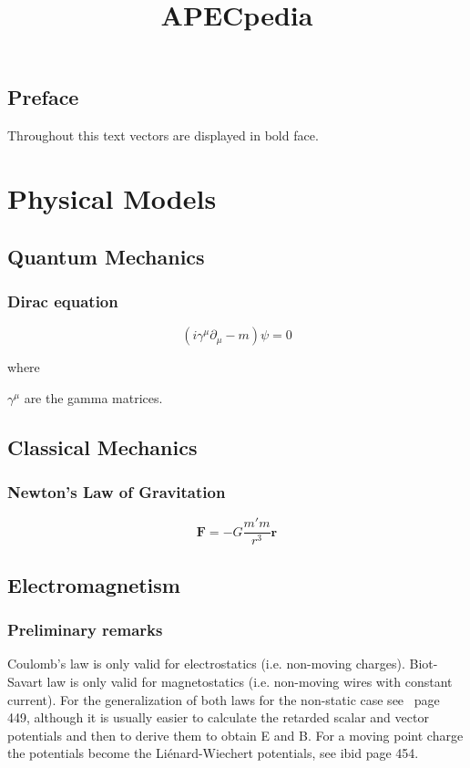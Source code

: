\documentclass[english]{book}
\title{APECpedia}
\begin{document}
\maketitle

\tableofcontents

\chapter*{Preface} \nonumber

Throughout this text vectors are displayed in bold face.


\part{Physical Models}


\chapter{Quantum Mechanics}

\section{Dirac equation}

\[
\left( i \gamma^{\mu}\partial_{\mu} - m \right) \psi = 0
\]

where

$\gamma^{\mu}$ are the gamma matrices.

\chapter{Classical Mechanics}

\section{Newton's Law of Gravitation}

\[
\mathbf{F} = -G \frac{m'm}{r^3} \mathbf{r}
\]

\chapter{Electromagnetism}

\section{Preliminary remarks}

Coulomb's law is only valid for electrostatics (i.e. non-moving charges). Biot-Savart law is only valid for magnetostatics (i.e. non-moving wires with constant current). For the generalization of both laws for the non-static case see~\cite{Griffiths} page 449, although it is usually easier to calculate the retarded scalar and vector potentials and then to derive them to obtain E and B. For a moving point charge the potentials become the Liénard-Wiechert potentials, see ibid page 454.
\end{document}
